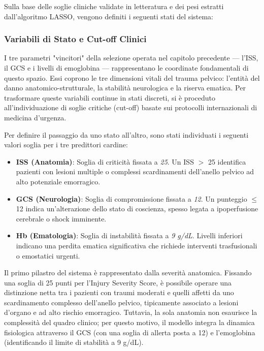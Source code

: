\documentclass[11pt, oneside, noexaminfo]{sapthesis}   	%
\begin{document}
Sulla base delle soglie cliniche validate in letteratura e dei pesi estratti dall'algoritmo LASSO, vengono definiti i seguenti stati del sistema:

\subsubsection{Variabili di Stato e Cut-off Clinici}
I tre parametri "vincitori" della selezione operata nel capitolo precedente — l'ISS, il GCS e i livelli di emoglobina — rappresentano le coordinate fondamentali di questo spazio. Essi coprono le tre dimensioni vitali del trauma pelvico: l'entità del danno anatomico-strutturale, la stabilità neurologica e la riserva ematica. Per trasformare queste variabili continue in stati discreti, si è proceduto all'individuazione di soglie critiche (cut-off) basate sui protocolli internazionali di medicina d'urgenza.

Per definire il passaggio da uno stato all'altro, sono stati individuati i seguenti valori soglia per i tre predittori cardine:
\begin{itemize}
\item \textbf{ISS (Anatomia)}: Soglia di criticità fissata a \textit{25}. Un ISS $>$ 25 identifica pazienti con lesioni multiple o complessi scardinamenti dell'anello pelvico ad alto potenziale emorragico.
\item \textbf{GCS (Neurologia)}: Soglia di compromissione fissata a \textit{12}. Un punteggio $\le$12
indica un'alterazione dello stato di coscienza, spesso legata a ipoperfusione cerebrale o shock imminente.
\item \textbf{Hb (Ematologia)}: Soglia di instabilità fissata a \textit{9 g/dL}. Livelli inferiori indicano una perdita ematica significativa che richiede interventi trasfusionali o emostatici urgenti.
\end{itemize}

Il primo pilastro del sistema è rappresentato dalla severità anatomica. Fissando una soglia di 25 punti per l'Injury Severity Score, è possibile operare una distinzione netta tra i pazienti con traumi moderati e quelli affetti da uno scardinamento complesso dell'anello pelvico, tipicamente associato a lesioni d'organo e ad alto rischio emorragico. Tuttavia, la sola anatomia non esaurisce la complessità del quadro clinico; per questo motivo, il modello integra la dinamica fisiologica attraverso il GCS (con una soglia di allerta posta a 12) e l'emoglobina (identificando il limite di stabilità a 9 g/dL).
\end{document}
